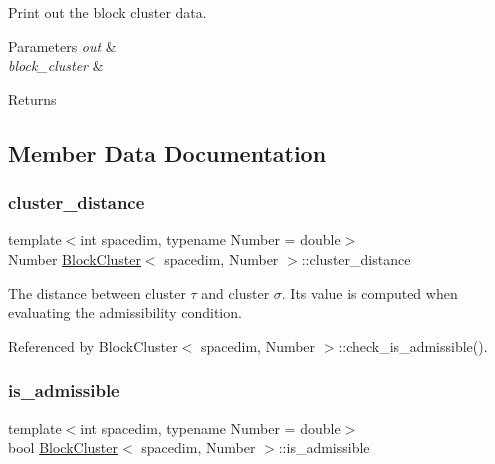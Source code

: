 Print out the block cluster data. 
\begin{DoxyParams}{Parameters}
{\em out} & \\
\hline
{\em block\+\_\+cluster} & \\
\hline
\end{DoxyParams}
\begin{DoxyReturn}{Returns}

\end{DoxyReturn}


\subsection{Member Data Documentation}
\mbox{\label{classBlockCluster_a2b843d0eaae1bf4b49ec82ffcb75e798}} 
\subsubsection{\texorpdfstring{cluster\+\_\+distance}{cluster\_distance}}
{\footnotesize\ttfamily template$<$int spacedim, typename Number = double$>$ \\
Number \hyperlink{classBlockCluster}{Block\+Cluster}$<$ spacedim, Number $>$\+::cluster\+\_\+distance\hspace{0.3cm}{\ttfamily [private]}}

The distance between cluster $\tau$ and cluster $\sigma$. Its value is computed when evaluating the admissibility condition. 

Referenced by Block\+Cluster$<$ spacedim, Number $>$\+::check\+\_\+is\+\_\+admissible().

\mbox{\label{classBlockCluster_ae85d165894d10b7e58fbe20edd506abe}} 
\subsubsection{\texorpdfstring{is\+\_\+admissible}{is\_admissible}}
{\footnotesize\ttfamily template$<$int spacedim, typename Number = double$>$ \\
bool \hyperlink{classBlockCluster}{Block\+Cluster}$<$ spacedim, Number $>$\+::is\+\_\+admissible\hspace{0.3cm}{\ttfamily [private]}}

